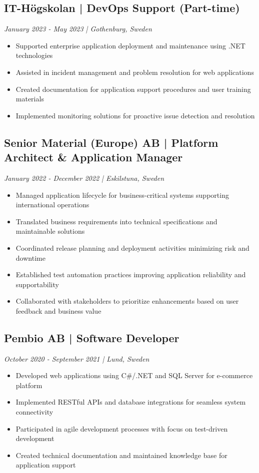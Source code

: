 \documentclass[11pt,a4paper]{article}
\begin{document}
\subsection*{IT-Högskolan | DevOps Support (Part-time)}
\textit{January 2023 - May 2023 | Gothenburg, Sweden}
\begin{itemize}[noitemsep]
\item Supported enterprise application deployment and maintenance using .NET technologies
\item Assisted in incident management and problem resolution for web applications
\item Created documentation for application support procedures and user training materials
\item Implemented monitoring solutions for proactive issue detection and resolution
\end{itemize}

\subsection*{Senior Material (Europe) AB | Platform Architect \& Application Manager}
\textit{January 2022 - December 2022 | Eskilstuna, Sweden}
\begin{itemize}[noitemsep]
\item Managed application lifecycle for business-critical systems supporting international operations
\item Translated business requirements into technical specifications and maintainable solutions
\item Coordinated release planning and deployment activities minimizing risk and downtime
\item Established test automation practices improving application reliability and supportability
\item Collaborated with stakeholders to prioritize enhancements based on user feedback and business value
\end{itemize}

\subsection*{Pembio AB | Software Developer}
\textit{October 2020 - September 2021 | Lund, Sweden}
\begin{itemize}[noitemsep]
\item Developed web applications using C\#/.NET and SQL Server for e-commerce platform
\item Implemented RESTful APIs and database integrations for seamless system connectivity
\item Participated in agile development processes with focus on test-driven development
\item Created technical documentation and maintained knowledge base for application support
\end{itemize}
\end{document}
